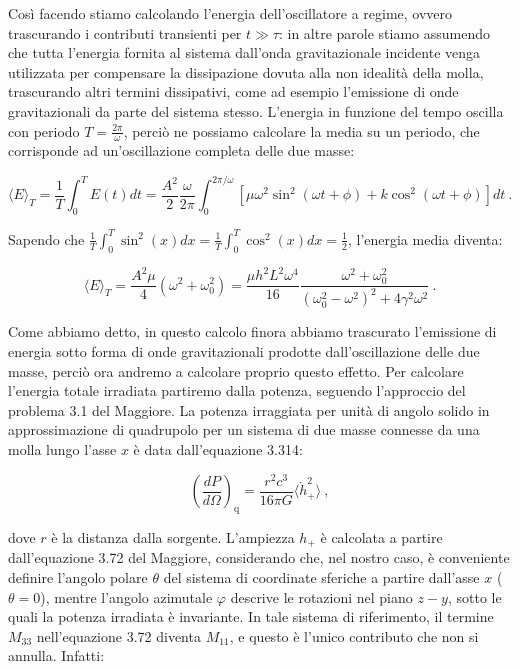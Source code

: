 \documentclass[a4paper,10pt]{article}
\begin{document}
Così facendo stiamo calcolando l'energia dell'oscillatore a regime, ovvero trascurando i contributi transienti per $t \gg \tau$: in altre parole stiamo assumendo che tutta l'energia fornita al sistema dall'onda gravitazionale incidente venga utilizzata per compensare la dissipazione dovuta alla non idealità della molla, trascurando altri termini dissipativi, come ad esempio l'emissione di onde gravitazionali da parte del sistema stesso.
L'energia in funzione del tempo oscilla con periodo $T=\frac{2\pi}{\omega}$, perciò ne possiamo calcolare la media su un periodo, che corrisponde ad un'oscillazione completa delle due masse:

\begin{equation} \label{eq:energiaperiodo}
    \langle E \rangle_T = \frac{1}{T} \int_0^T E(t) dt = \frac{A^2}{2} \frac{\omega}{2\pi} \int_0^{2\pi/\omega} [\mu \omega^2 \sin^2(\omega t + \phi) + k \cos^2(\omega t + \phi)] dt \ .
\end{equation}

Sapendo che $\frac{1}{T}\int_0^T\sin^2(x)dx = \frac{1}{T}\int_0^T\cos^2(x)dx = \frac{1}{2}$, l'energia media diventa:

\begin{equation} \label{eq:energiamediaperiodo}
    \langle E \rangle_T = \frac{A^2 \mu}{4} (\omega^2 + \omega_0^2) = \frac{\mu h^2 L^2 \omega^4}{16} \frac{\omega^2 + \omega_0^2}{(\omega_0^2 - \omega^2)^2 + 4 \gamma^2 \omega^2} \ .
\end{equation}

Come abbiamo detto, in questo calcolo finora abbiamo trascurato l'emissione di energia sotto forma di onde gravitazionali prodotte dall'oscillazione delle due masse, perciò ora andremo a calcolare proprio questo effetto.
Per calcolare l'energia totale irradiata partiremo dalla potenza, seguendo l'approccio del problema 3.1 del Maggiore.
La potenza irraggiata per unità di angolo solido in approssimazione di quadrupolo per un sistema di due masse connesse da una molla lungo l'asse $x$ è data dall'equazione 3.314:

\begin{equation} \label{eq:potangsolido}
    \left( \frac{dP}{d\Omega} \right)_{\text{q}} = \frac{r^2 c^3}{16 \pi G} \langle \dot h_+^2 \rangle \ ,
\end{equation}

dove $r$ è la distanza dalla sorgente. L'ampiezza $h_+$ è calcolata a partire dall'equazione 3.72 del Maggiore, considerando che, nel nostro caso, è conveniente definire l'angolo polare $\theta$ del sistema di coordinate sferiche a partire dall'asse $x$ ($\theta=0$), mentre l'angolo azimutale $\varphi$ descrive le rotazioni nel piano $z-y$, sotto le quali la potenza irradiata è invariante.
In tale sistema di riferimento, il termine $M_{33}$ nell'equazione 3.72 diventa $M_{11}$, e questo è l'unico contributo che non si annulla.
Infatti:
\end{document}
